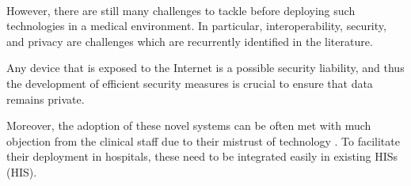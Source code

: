 \paragraph{} However, there are still many challenges to tackle before deploying such technologies in a medical environment. In particular, interoperability, security, and privacy are challenges which are recurrently identified in the literature. 

Any device that is exposed to the Internet is a possible security liability, and thus the development of efficient security measures is crucial to ensure that data remains private. 

Moreover, the adoption of these novel systems can be often met with much objection from the clinical staff due to their mistrust of technology \cite{DursunErgezen2020}. To facilitate their deployment in hospitals, these need to be integrated easily in existing \acl{HIS}s (\acs{HIS}).





